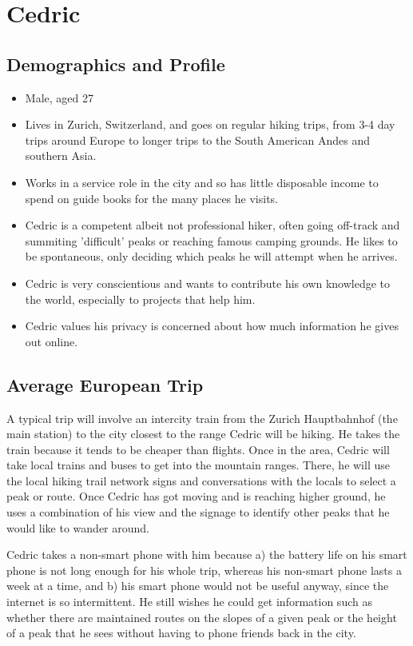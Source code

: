 \documentclass[authoryearcitations]{UoYCSproject}
\begin{document}
\newpage
\section{Cedric}
\subsection{Demographics and Profile}
\begin{itemize}
  \item Male, aged 27
  \item Lives in Zurich, Switzerland, and goes on regular hiking trips, from 3-4 day trips around Europe to longer trips to the South American Andes and southern Asia.
  \item Works in a service role in the city and so has little disposable income to spend on guide books for the many places he visits.
  \item Cedric is a competent albeit not professional hiker, often going off-track and summiting 'difficult' peaks or reaching famous camping grounds.  He likes to be spontaneous, only deciding which peaks he will attempt when he arrives.
  \item Cedric is very conscientious and wants to contribute his own knowledge to the world, especially to projects that help him.
  \item Cedric values his privacy is concerned about how much information he gives out online.
\end{itemize}
\subsection{Average European Trip}
A typical trip will involve an intercity train from the Zurich Hauptbahnhof (the main station) to the city closest to the range Cedric will be hiking.  He takes the train because it tends to be cheaper than flights.  Once in the area, Cedric will take local trains and buses to get into the mountain ranges.  There, he will use the local hiking trail network signs and conversations with the locals to select a peak or route.  Once Cedric has got moving and is reaching higher ground, he uses a combination of his view and the signage to identify other peaks that he would like to wander around.  

Cedric takes a non-smart phone with him because a) the battery life on his smart phone is not long enough for his whole trip, whereas his non-smart phone lasts a week at a time, and b) his smart phone would not be useful anyway, since the internet is so intermittent.  He still wishes he could get information such as whether there are maintained routes on the slopes of a given peak or the height of a peak that he sees without having to phone friends back in the city.
\newpage
\end{document}
